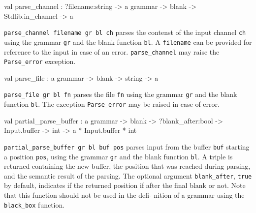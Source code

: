 \documentclass[11pt]{article}
\begin{document}
\label{val:Earley.parse-underscorechannel}\begin{ocamldoccode}
val parse_channel :
  ?filename:string ->
  {\textquotesingle}a grammar -> blank -> Stdlib.in_channel -> {\textquotesingle}a
\end{ocamldoccode}
\begin{ocamldocdescription}
{\tt{parse\_channel {}filename gr bl ch}} parses the contenst of  the  input
    channel {\tt{ch}} using the grammar {\tt{gr}} and the blank  function  {\tt{bl}}.  A
    {\tt{filename}} can be provided for reference to the input in case  of  an
    error. {\tt{parse\_channel}} may raise the {\tt{Parse\_error}} exception.


\end{ocamldocdescription}




\label{val:Earley.parse-underscorefile}\begin{ocamldoccode}
val parse_file : {\textquotesingle}a grammar -> blank -> string -> {\textquotesingle}a
\end{ocamldoccode}
\begin{ocamldocdescription}
{\tt{parse\_file gr bl fn}} parses the file {\tt{fn}} using the grammar {\tt{gr}} and
    the blank function {\tt{bl}}. The exception {\tt{Parse\_error}} may be raised in
    case of error.


\end{ocamldocdescription}




\label{val:Earley.partial-underscoreparse-underscorebuffer}\begin{ocamldoccode}
val partial_parse_buffer :
  {\textquotesingle}a grammar ->
  blank ->
  ?blank_after:bool -> Input.buffer -> int -> {\textquotesingle}a * Input.buffer * int
\end{ocamldoccode}
\begin{ocamldocdescription}
{\tt{partial\_parse\_buffer gr bl buf pos}} parses  input  from  the  buffer
    {\tt{buf}} starting a position {\tt{pos}}, using the grammar {\tt{gr}} and the blank
    function {\tt{bl}}. A triple is returned containing the  new  buffer,  the
    position that was reached during parsing, and the semantic result  of
    the parsing. The optional argument {\tt{blank\_after}}, {\tt{true}} by default,
    indicates if the returned position if after the final blank or not.
    Note that this function should not be used in the  defi-
    nition of a grammar using the {\tt{black\_box}} function.


\end{ocamldocdescription}
\end{document}
